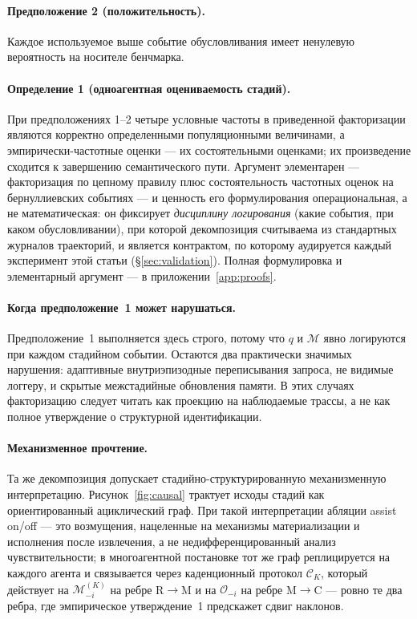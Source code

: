 \documentclass{article}
\begin{document}
\paragraph{Предположение 2 (положительность).}
Каждое используемое выше событие обусловливания имеет ненулевую вероятность на
носителе бенчмарка.

\paragraph{Определение 1 (одноагентная оцениваемость стадий).}
При предположениях 1--2 четыре условные частоты в приведенной факторизации являются корректно определенными популяционными величинами, а эмпирически-частотные оценки --- их состоятельными оценками; их произведение сходится к завершению семантического пути. Аргумент элементарен --- факторизация по цепному правилу плюс состоятельность частотных оценок на бернуллиевских событиях --- и ценность его формулирования операциональная, а не математическая: он фиксирует \emph{дисциплину логирования} (какие события, при каком обусловливании), при которой декомпозиция считываема из стандартных журналов траекторий, и является контрактом, по которому аудируется каждый эксперимент этой статьи (\S\ref{sec:validation}). Полная формулировка и элементарный аргумент --- в приложении~\ref{app:proofs}.

\paragraph{Когда предположение~1 может нарушаться.}
Предположение~1 выполняется здесь строго, потому что $q$ и $\mathcal{M}$
явно логируются при каждом стадийном событии. Остаются два практически значимых
нарушения: адаптивные внутриэпизодные переписывания запроса, не видимые
логгеру, и скрытые межстадийные обновления памяти. В этих случаях
факторизацию следует читать как проекцию на наблюдаемые
трассы, а не как полное утверждение о структурной идентификации.

\paragraph{Механизменное прочтение.}
Та же декомпозиция допускает стадийно-структурированную механизменную
интерпретацию. Рисунок~\ref{fig:causal} трактует исходы стадий как
ориентированный ациклический граф. При такой интерпретации абляции assist on/off
--- это возмущения, нацеленные на механизмы материализации и
исполнения после извлечения, а не недифференцированный анализ
чувствительности; в многоагентной постановке тот же граф реплицируется на каждого
агента и связывается через каденционный протокол $\mathcal{C}_K$,
который действует на $\mathcal{M}_{-i}^{(K)}$ на ребре R$\to$M и на
$\mathcal{O}_{-i}$ на ребре M$\to$C --- ровно те два ребра, где
эмпирическое утверждение~1 предскажет сдвиг наклонов.
\end{document}
